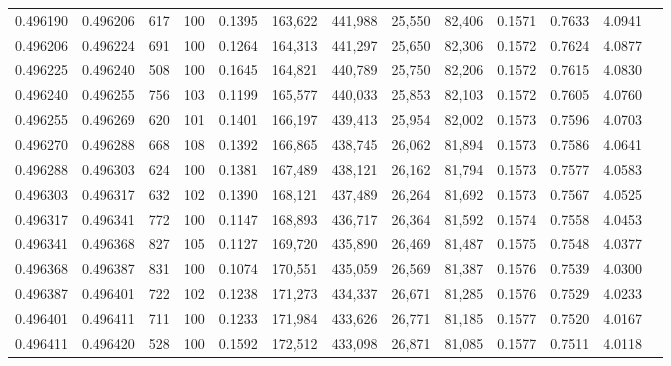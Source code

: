 \begin{tabular}{rrrrrrrrrrrrr}
0.496190 & 0.496206 &   617 & 100 &                                     0.1395 & 163,622 & 441,988 &  25,550 &  82,406 & 0.1571 & 0.7633 & 4.0941 \\
0.496206 & 0.496224 &   691 & 100 &                                     0.1264 & 164,313 & 441,297 &  25,650 &  82,306 & 0.1572 & 0.7624 & 4.0877 \\
0.496225 & 0.496240 &   508 & 100 &                                     0.1645 & 164,821 & 440,789 &  25,750 &  82,206 & 0.1572 & 0.7615 & 4.0830 \\
0.496240 & 0.496255 &   756 & 103 &                                     0.1199 & 165,577 & 440,033 &  25,853 &  82,103 & 0.1572 & 0.7605 & 4.0760 \\
0.496255 & 0.496269 &   620 & 101 &                                     0.1401 & 166,197 & 439,413 &  25,954 &  82,002 & 0.1573 & 0.7596 & 4.0703 \\
0.496270 & 0.496288 &   668 & 108 &                                     0.1392 & 166,865 & 438,745 &  26,062 &  81,894 & 0.1573 & 0.7586 & 4.0641 \\
0.496288 & 0.496303 &   624 & 100 &                                     0.1381 & 167,489 & 438,121 &  26,162 &  81,794 & 0.1573 & 0.7577 & 4.0583 \\
0.496303 & 0.496317 &   632 & 102 &                                     0.1390 & 168,121 & 437,489 &  26,264 &  81,692 & 0.1573 & 0.7567 & 4.0525 \\
0.496317 & 0.496341 &   772 & 100 &                                     0.1147 & 168,893 & 436,717 &  26,364 &  81,592 & 0.1574 & 0.7558 & 4.0453 \\
0.496341 & 0.496368 &   827 & 105 &                                     0.1127 & 169,720 & 435,890 &  26,469 &  81,487 & 0.1575 & 0.7548 & 4.0377 \\
0.496368 & 0.496387 &   831 & 100 &                                     0.1074 & 170,551 & 435,059 &  26,569 &  81,387 & 0.1576 & 0.7539 & 4.0300 \\
0.496387 & 0.496401 &   722 & 102 &                                     0.1238 & 171,273 & 434,337 &  26,671 &  81,285 & 0.1576 & 0.7529 & 4.0233 \\
0.496401 & 0.496411 &   711 & 100 &                                     0.1233 & 171,984 & 433,626 &  26,771 &  81,185 & 0.1577 & 0.7520 & 4.0167 \\
0.496411 & 0.496420 &   528 & 100 &                                     0.1592 & 172,512 & 433,098 &  26,871 &  81,085 & 0.1577 & 0.7511 & 4.0118 \\

\end{tabular}
